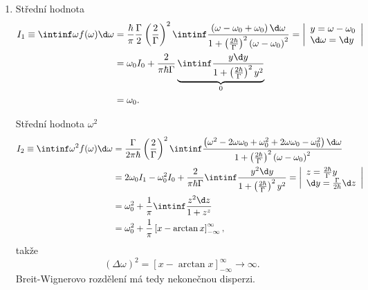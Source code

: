 \begin{solution}
\begin{enumerate}
	\item
		Střední hodnota
		\begin{align}
			I_{1}\equiv\intinf\omega f(\omega)\d\omega
				&=\frac{\hbar}{\pi}\frac{\Gamma}{2}\left(\frac{2}{\Gamma}\right)^{2}\intinf\frac{\left(\omega-\omega_{0}+\omega_{0}\right)\d\omega}{1+\left(\frac{2\hbar}{\Gamma}\right)^{2}\left(\omega-\omega_{0}\right)^{2}}
						=\left|\begin{array}{l}y=\omega-\omega_{0} \\ \d\omega=\d y\end{array}\right|\nonumber\\
				&=\omega_{0}I_{0}+\frac{2}{\pi\hbar\Gamma}\underbrace{\intinf\frac{y\d y}{1+\left(\frac{2\hbar}{\Gamma}\right)^{2}y^{2}}}_{0}\nonumber\\
				&=\omega_{0}.
		\end{align}
		
		Střední hodnota $\omega^{2}$
		\begin{align}
			I_{2}\equiv\intinf\omega^{2}f(\omega)\d\omega
				&=\frac{\Gamma}{2\pi\hbar}\left(\frac{2}{\Gamma}\right)^{2}\intinf\frac{\left(\omega^{2}-2\omega\omega_{0}+\omega_{0}^{2}+2\omega\omega_{0}-\omega_{0}^{2}\right)\d\omega}
						{1+\left(\frac{2\hbar}{\Gamma}\right)^{2}\left(\omega-\omega_{0}\right)^{2}}\nonumber\\
				&=2\omega_{0}I_{1}-\omega_{0}^{2}I_{0}+\frac{2}{\pi\hbar\Gamma}\intinf\frac{y^{2}\d y}{1+\left(\frac{2\hbar}{\Gamma}\right)^{2}y^{2}}
						=\left|\begin{array}{l}z=\frac{2\hbar}{\Gamma}y \\ \d y=\frac{\Gamma}{2\hbar}\d z\end{array}\right|\nonumber\\
				&=\omega_{0}^{2}+\frac{1}{\pi}\intinf\frac{z^{2}\d z}{1+z^{z}}\nonumber\\
				&=\omega_{0}^{2}+\frac{1}{\pi}\left[x-\arctan{x}\right]_{-\infty}^{\infty},
		\end{align}
		takže
		\begin{equation}
			\left(\Delta\omega\right)^{2}=\left[x-\arctan{x}\right]_{-\infty}^{\infty}\rightarrow\infty.
		\end{equation}
		Breit-Wignerovo rozdělení má tedy nekonečnou disperzi.		
	\end{enumerate}
	

\end{solution}
